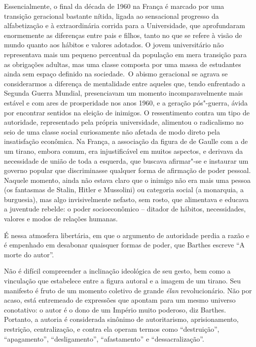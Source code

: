 Essencialmente, o final da década de 1960 na França é marcado por uma
transição geracional bastante nítida, ligada ao sensacional progresso da
alfabetização e à extraordinária corrida para a Universidade, que
aprofundaram enormemente as diferenças entre pais e filhos, tanto no que
se refere à visão de mundo quanto aos hábitos e valores adotados. O
jovem universitário não representava mais um pequeno percentual da
população em mera transição para as obrigações adultas, mas uma classe
composta por uma massa de estudantes ainda sem espaço definido na
sociedade.~O abismo geracional se agrava se considerarmos a diferença de
mentalidade entre aqueles que, tendo enfrentado a Segunda Guerra
Mundial, presenciavam um momento incomparavelmente mais estável e com
ares de prosperidade nos anos 1960, e a geração pós"-guerra, ávida por
encontrar sentidos na eleição de inimigos. O ressentimento contra um
tipo de autoridade, representado pela própria universidade, alimentou o
radicalismo no seio de uma classe social curiosamente não afetada de
modo direto pela insatisfação econômica. Na França, a associação da
figura de de Gaulle com a de um tirano, embora comum, era injustificável
em muitos aspectos, e derivava da necessidade de união de toda a
esquerda, que buscava afirmar"-se e instaurar um governo popular que
discriminasse qualquer forma de afirmação de poder pessoal. Naquele
momento, ainda não estava claro que o inimigo não era mais uma pessoa
(os fantasmas de Stalin, Hitler e Mussolini) ou categoria social (a monarquia, a burguesia), mas algo invisivelmente nefasto, sem rosto, que
alimentava e educava a juventude rebelde: o poder socioeconômico --
ditador de hábitos, necessidades, valores e modos de relações humanas.

É nessa atmosfera libertária, em que o argumento de autoridade perdia a
razão e é empenhado em desabonar quaisquer formas de poder, que Barthes
escreve ``A morte do autor''.

Não é difícil compreender a inclinação ideológica de seu gesto, bem como
a vinculação que estabelece entre a figura autoral e a imagem de um
tirano. Seu manifesto é fruto de um momento coletivo de grande \emph{élan}
revolucionário. Não por acaso, está entremeado de expressões que apontam
para um mesmo universo conotativo: o autor é o dono de um Império muito
poderoso, diz Barthes. Portanto, a autoria é considerada sinônimo de
autoritarismo, aprisionamento, restrição, centralização, e contra ela
operam termos como ``destruição'', ``apagamento'', ``desligamento'',
``afastamento'' e ``dessacralização''.

